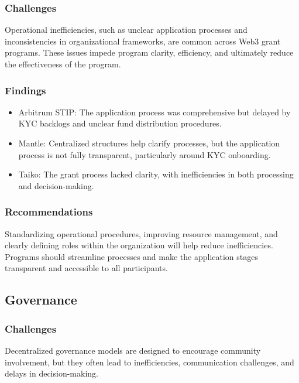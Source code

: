 \documentclass[a4,10pt]{article}
\begin{document}
\subsubsection{Challenges}\label{sec_9.2.1}
Operational inefficiencies, such as unclear application processes and inconsistencies in organizational frameworks, are common across Web3 grant programs. These issues impede program clarity, efficiency, and ultimately reduce the effectiveness of the program.

\subsubsection{Findings}\label{sec_9.2.2}
\begin{itemize}
    \item Arbitrum STIP: The application process was comprehensive but delayed by KYC backlogs and unclear fund distribution procedures.
    \item Mantle: Centralized structures help clarify processes, but the application process is not fully transparent, particularly around KYC onboarding.
    \item Taiko: The grant process lacked clarity, with inefficiencies in both processing and decision-making.
\end{itemize}

\subsubsection{Recommendations}\label{sec_9.2.3}
Standardizing operational procedures, improving resource management, and clearly defining roles within the organization will help reduce inefficiencies. Programs should streamline processes and make the application stages transparent and accessible to all participants.

\subsection{Governance}\label{sec_9.3}

\subsubsection{Challenges}\label{sec_9.3.1}
Decentralized governance models are designed to encourage community involvement, but they often lead to inefficiencies, communication challenges, and delays in decision-making.
\end{document}

